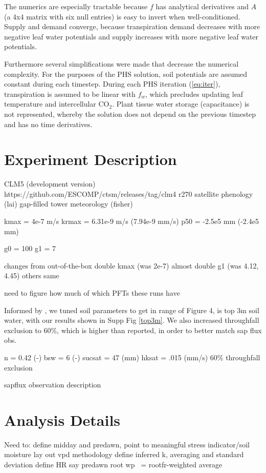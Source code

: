 \documentclass[draft,linenumbers]{agujournal}
\begin{document}
    The numerics are especially tractable because $f$ has analytical derivatives and $A$ 
    (a 4x4 matrix with six null entries) is easy to invert when well-conditioned. 
    Supply and demand converge, because transpiration demand decreases with more negative 
    leaf water potentials and supply increases with more negative leaf water potentials.
    
    Furthermore several simplifications were made that decrease the numerical complexity.
    For the purposes of the PHS solution, soil potentials are assumed constant during each timestep.
    During each PHS iteration (\ref{eq:iter}), transpiration is assumed to be linear with $f_w$,
    which precludes updating leaf temperature and intercellular CO$_2$.
    Plant tissue water storage (capacitance) is not represented, whereby the solution does not
    depend on the previous timestep and has no time derivatives.

\section{Experiment Description}
CLM5 (development version) 
https://github.com/ESCOMP/ctsm/releases/tag/clm4
\textunderscore r270
satellite phenology (lai)
gap-filled tower meteorology (fisher)

kmax =  4e-7 m/s
krmax = 6.31e-9 m/s (7.94e-9 mm/s)
p50 = -2.5e5 mm (-2.4e5 mm)

g0 = 100
g1 = 7

changes from out-of-the-box
double kmax (was 2e-7)
almost double g1 (was 4.12, 4.45)
others same

need to figure how much of which PFTs these runs have

Informed by \cite{fisher2008}, we tuned soil parameters to get in range of 
\cite{fisher2007} Figure 4, is top 3m soil water, with our results shown in Supp Fig \ref{top3m}.
We also increased throughfall exclusion to 60\%, which is higher than reported, in order to better match sap flux obs.

n = 0.42 (-)
bsw = 6 (-)
sucsat = 47 (mm)
hksat = .015 (mm/s)
60\% throughfall exclusion

sapflux observation description

\section{Analysis Details}  
Need to:
define midday and predawn, point to meaningful stress indicator/soil moisture
lay out vpd methodology
define inferred k, averaging and standard deviation
define HR
say predawn root wp ~= rootfr-weighted average
\end{document}
